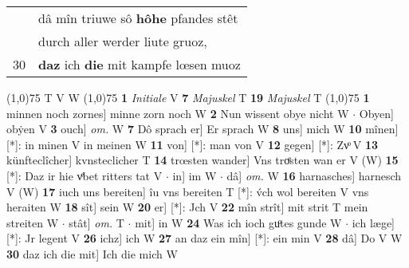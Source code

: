 \documentclass[8pt,a4paper,notitlepage]{article}
\begin{document}
\begin{table}[ht]
\begin{minipage}[t]{0.5\linewidth}
\begin{tabular}{rl}
 & dâ mîn triuwe sô \textbf{hôhe} pfandes stêt\\ 
 & durch aller werder liute gruoz,\\ 
30 & \textbf{daz} ich \textbf{die} mit kampfe lœsen muoz\\ 
\end{tabular}
\scriptsize
\line(1,0){75} \newline
T V W \newline
\line(1,0){75} \newline
\textbf{1} \textit{Initiale} V  \textbf{7} \textit{Majuskel} T  \textbf{19} \textit{Majuskel} T  \newline
\line(1,0){75} \newline
\textbf{1} minnen noch zornes] minne zorn noch W \textbf{2} Nun wissent obye nicht W  $\cdot$ Obyen] obẏen V \textbf{3} ouch] \textit{om.} W \textbf{7} Dô sprach er] Er sprach W \textbf{8} uns] mich W \textbf{10} mînen] [*]: in minen V in meinen W \textbf{11} von] [*]: man von V \textbf{12} gegen] [*]: Zvͦ V \textbf{13} künfteclîcher] kvnsteclicher T \textbf{14} trœsten wander] Vns troͤsten wan er V (W) \textbf{15} [*]: Daz ir hie vͤbet ritters tat V  $\cdot$ in] im W  $\cdot$ dâ] \textit{om.} W \textbf{16} harnasches] harnesch V (W) \textbf{17} iuch uns bereiten] îu vns bereiten T [*]: v́ch wol bereiten V vns heraiten W \textbf{18} sît] sein W \textbf{20} er] [*]: Jch V \textbf{22} mîn strît] mit strit T mein streiten W  $\cdot$ stât] \textit{om.} T  $\cdot$ mit] in W \textbf{24} Was ich ioch guͦtes gunde W  $\cdot$ ich læge] [*]: Jr legent V \textbf{26} ichz] ich W \textbf{27} an daz ein mîn] [*]: ein min V \textbf{28} dâ] Do V W \textbf{30} daz ich die mit] Ich die mich W \newline
\end{minipage}
\end{table}
\end{document}
